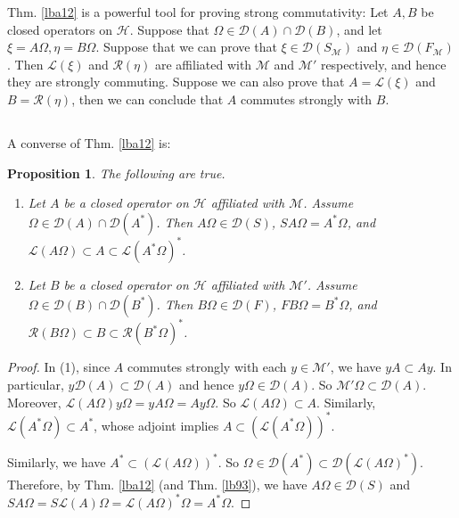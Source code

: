 \documentclass[12pt,b5paper,notitlepage]{article}
\theoremstyle{definition}
\theoremstyle{plain}
\newtheorem{pp}[df]{Proposition}
\newcommand{\mc}{\mathcal}
\newcommand{\Dom}{\scr{D}}
\newcommand{\scr}{\mathscr}
\numberwithin{equation}{section}
\begin{document}
Thm. \ref{lba12} is a powerful tool for proving strong commutativity: Let $A,B$ be closed operators on $\mc H$. Suppose that $\Omega\in\Dom(A)\cap\Dom(B)$, and let $\xi=A\Omega,\eta=B\Omega$. Suppose that we can prove that $\xi\in\Dom(S_{\mc M})$ and $\eta\in\Dom(F_{\mc M})$. Then $\scr L(\xi)$ and $\scr R(\eta)$ are affiliated with $\mc M$ and $\mc M'$ respectively, and hence they are strongly commuting. Suppose we can also prove that $A=\scr L(\xi)$ and $B=\scr R(\eta)$, then we can conclude that $A$ commutes strongly with $B$.




\subsection{}



A converse of Thm. \ref{lba12} is:

\begin{pp}\label{lba14}
The following are true.
\begin{enumerate}
\item[(1)] Let $A$ be a closed operator on $\mc H$ affiliated with $\mathcal M$. Assume $\Omega\in\Dom(A)\cap\Dom(A^*)$. Then $A\Omega\in\Dom(S)$, $SA\Omega=A^*\Omega$, and $\scr L(A\Omega)\subset A\subset \scr L(A^*\Omega)^*$.
\item[(2)] Let $B$ be a closed operator on $\mc H$ affiliated with $\mathcal M'$. Assume $\Omega\in\Dom(B)\cap\Dom(B^*)$. Then $B\Omega\in\Dom(F)$, $FB\Omega=B^*\Omega$, and $\scr R(B\Omega)\subset B\subset \scr R(B^*\Omega)^*$.
\end{enumerate}
\end{pp}


\begin{proof}
In (1), since $A$ commutes strongly with each $y\in\mc M'$, we have $yA\subset Ay$. In particular, $y\Dom(A)\subset \Dom(A)$ and hence $y\Omega\in\Dom(A)$. So $\mc M'\Omega\subset\Dom(A)$. Moreover, $\scr L(A\Omega)y\Omega=yA\Omega=Ay\Omega$. So $\scr L(A\Omega)\subset A$. Similarly, $\scr L(A^*\Omega)\subset A^*$, whose adjoint implies $A\subset(\scr L(A^*\Omega))^*$. 


Similarly, we have $A^*\subset(\scr L(A\Omega))^*$. So $\Omega\in\Dom(A^*)\subset\Dom(\scr L(A\Omega)^*)$. Therefore, by Thm. \ref{lba12} (and Thm. \ref{lb93}), we have $A\Omega\in\Dom(S)$ and $SA\Omega=S\scr L(A)\Omega=\scr L(A\Omega)^*\Omega=A^*\Omega$.
\end{proof}
\end{document}
